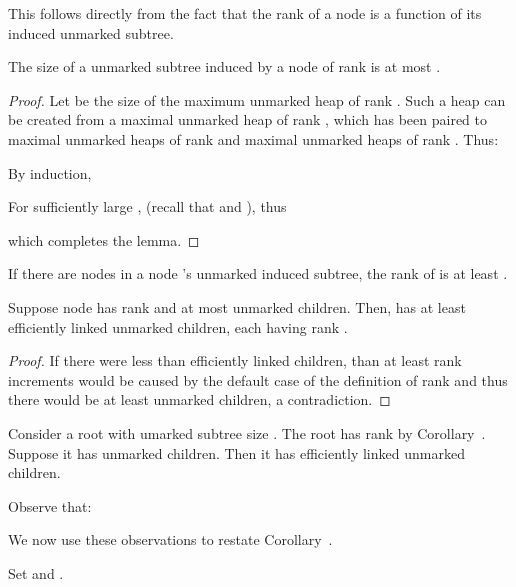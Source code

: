 This follows directly from the fact that the rank of a node is a function of its induced unmarked subtree.
\begin{fullonly}
\begin{lemma}The size of a unmarked subtree induced by a node of rank  is at most .
\end{lemma}

\begin{proof}
Let  be the size of the maximum unmarked heap of rank . Such a heap can be created from a maximal unmarked heap of rank , which has been paired to  maximal unmarked heaps of rank  and  maximal unmarked heaps of rank . Thus:




By induction, 

 

For sufficiently large ,  (recall that  and ), thus



which completes the lemma. 

\end{proof}

\begin{cor} 
If there are  nodes in a node 's unmarked induced subtree, the rank of  is at least .
\end{cor}


\begin{lemma}
Suppose node  has rank  and at most  unmarked children. Then,  has at least  efficiently linked unmarked children, each having rank .
\end{lemma}


\begin{proof} If there were less than  efficiently linked children, than at least  rank increments would be caused by the default case of the definition of rank and thus there would be at least  unmarked children, a contradiction.
\end{proof}


\begin{cor}
Consider a root with umarked subtree size . 
The root has rank  by Corollary~. Suppose it has  unmarked children. Then it has  efficiently linked unmarked children.
\end{cor}

Observe that:





We now use these observations to restate Corollary~. 
\end{fullonly}
Set  and . 

